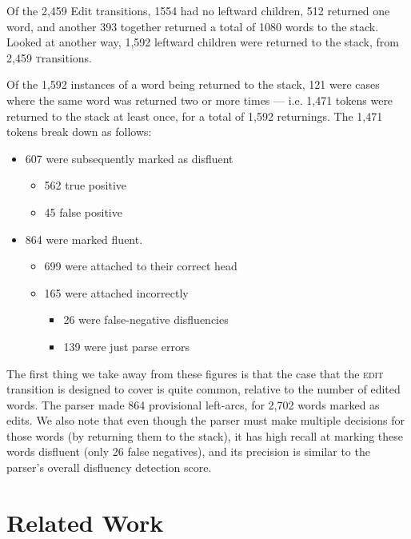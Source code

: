 \documentclass[11pt,letterpaper]{article}
\newcommand{\edittrans}{\textsc{edit}\xspace}
\begin{document}
Of the 2,459 Edit transitions, 1554 had no leftward children, 512 returned one word,
and another 393 together returned a total of 1080 words to the stack. Looked at
another way, 1,592 leftward children were returned to the stack, from
2,459 \textsc transitions.

Of the 1,592 instances of a word being returned to the stack, 121 were cases where
the same word was returned two or more times --- i.e. 1,471 tokens were returned
to the stack at least once, for a total of 1,592 returnings.
The 1,471 tokens break down as follows:
\vspace*{-0.5em}
\begin{itemize}
    \itemsep0ex
    \item 607 were subsequently marked as disfluent
        \begin{itemize}
            \itemsep0ex
            \item 562 true positive
            \item 45 false positive
        \end{itemize}
    \item 864 were marked fluent.
        \begin{itemize}
            \itemsep0ex
            \item 699 were attached to their correct head
            \item 165 were attached incorrectly
            \begin{itemize}
                \itemsep0ex
                \item 26 were false-negative disfluencies
                \item 139 were just parse errors
            \end{itemize}
        \end{itemize}
\end{itemize}

The first thing we take away from these figures is that the case that the \edittrans
transition is designed to cover is quite common, relative to the number of edited
words.  The parser made 864 provisional left-arcs, for 2,702 words marked as 
edits.  We also note that even though the parser must make multiple decisions for
those words (by returning them to the stack), it has high recall at marking these
words disfluent (only 26 false negatives), and its precision is similar to
the parser's overall disfluency detection score.

\section{Related Work}
\end{document}
